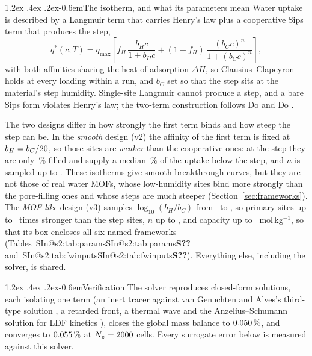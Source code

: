 \documentclass[10pt,a4paper]{article}
\makeatletter
\renewcommand\paragraph{\@startsection{paragraph}{4}{\z@}%
  {1.2ex \@plus .4ex \@minus .2ex}{-0.6em}{\normalfont\normalsize\bfseries}}
\newcommand{\SIref}[1]{\ifcsname SIn@#1\endcsname\csname SIn@#1\endcsname\else\textbf{S??}\fi}
\makeatother
\begin{document}
\paragraph{The isotherm, and what its parameters mean} Water uptake is described by a
Langmuir term that carries Henry's law plus a cooperative Sips term that produces the
step,
\begin{equation}
q^{*}(c,T) = q_{\max}\left[
f_H\,\frac{b_H c}{1 + b_H c}
+ (1-f_H)\,\frac{(b_C c)^{n}}{1 + (b_C c)^{n}} \right],
\label{eq:isotherm}
\end{equation}
with both affinities sharing the heat of adsorption \(\Delta H\), so Clausius--Clapeyron
holds at every loading within a run, and \(b_C\) set so that the step sits at the material's step
humidity. Single-site Langmuir cannot produce a step, and a bare Sips form violates
Henry's law; the two-term construction follows Do and Do \cite{dodo2000model}.

The two designs differ in how strongly the first term binds and how steep the step can be.
In the \emph{smooth} design (v2) the affinity of the first term is fixed at
\(b_H = b_C/20\), so those sites are \emph{weaker} than the cooperative ones: at the step
they are only \nIbsFill\,\% filled and supply a median \nIbsShareMed\,\% of the uptake below
the step, and \(n\) is sampled up to \nDcNexpHi. These isotherms give smooth breakthrough
curves, but they are not those of real water MOFs, whose low-humidity sites bind more
strongly than the pore-filling ones \cite{hanikel2021evolution,kalmutzki2018metal} and whose
steps are much steeper (Section~\ref{sec:frameworks}). The \emph{MOF-like} design (v3)
samples \(\log_{10}(b_H/b_C)\) from \nVthreeAffLo\ to \nVthreeAffHi, so primary sites up to
\nVthreeAffHiRatio\ times stronger than the step sites, \(n\) up to \nVthreeNmax, and
capacity up to \nVthreeQmaxHi\ mol\,kg\(^{-1}\), so that its box encloses all six named
frameworks (Tables~\SIref{s2:tab:params} and~\SIref{s2:tab:fwinputs}). Everything else, including the solver, is shared.

\paragraph{Verification} The solver reproduces \nLzeroNchecks{} closed-form solutions, each
isolating one term (an inert tracer against van Genuchten and Alves's third-type solution
\cite{vangenuchten1982analytical}, a retarded front, a thermal wave and the
Anzelius--Schumann solution for LDF kinetics \cite{anzelius1926uber,schumann1929heat}),
closes the global mass balance to \(0.050\,\%\), and converges to
\(0.055\,\%\) at \(N_z = 2000\) cells. Every surrogate error below is measured
against this solver.
\end{document}
